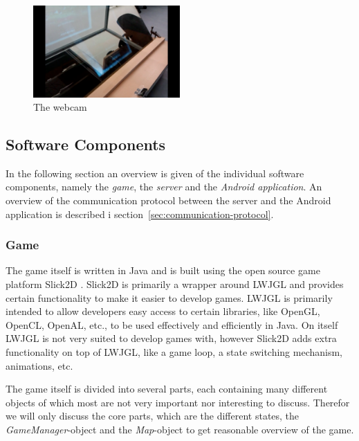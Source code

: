 \documentclass[a4paper,10pt]{report}
\begin{document}
		\begin{figure}[h!]
		\caption{The webcam}
		\centering
		\includegraphics[width=0.5\textwidth]{images/webcam}
		\end{figure}

	\subsection{Software Components}
	\label{sec:software-components}
	In the following section an overview is given of the individual software components, namely the \emph{game}, the \emph{server} and the \emph{Android application}.
	An overview of the communication protocol between the server and the Android application is described i section~\ref{sec:communication-protocol}.

		\subsubsection{Game}
		The game itself is written in Java and is built using the open source game platform Slick2D \cite{Slick2D}.
		Slick2D is primarily a wrapper around LWJGL \cite{LWJGL} and provides certain functionality to make it easier to develop games.
		LWJGL is primarily intended to allow developers easy access to certain libraries, like OpenGL, OpenCL, OpenAL, etc., to be used effectively and efficiently in Java.
		On itself LWJGL is not very suited to develop games with, however Slick2D adds extra functionality on top of LWJGL, like a game loop, a state switching mechanism, animations, etc.
		
		The game itself is divided into several parts, each containing many different objects of which most are not very important nor interesting to discuss.
		Therefor we will only discuss the core parts, which are the different states, the \emph{GameManager}-object and the \emph{Map}-object to get reasonable overview of the game.
		
\end{document}
